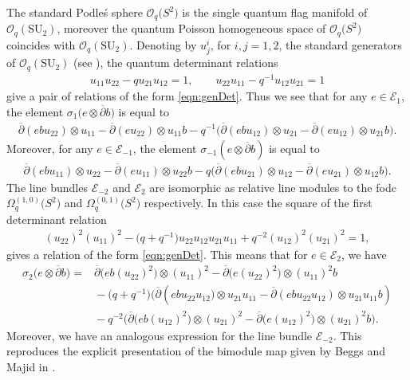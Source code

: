 \documentclass[10pt,a4paper]{amsart}
\numberwithin{equation}{section}
\newcommand\adel{\overline{\partial}}
\begin{document}
The standard Podle\'s sphere $\mathcal{O}_q\big(S^2\big)$ is the single quantum flag manifold of $\mathcal{O}_q(\mathrm{SU}_2)$, moreover the quantum Poisson homogeneous space of $\mathcal{O}_q\big(S^2\big)$ coincides with $\mathcal{O}_q(\mathrm{SU}_2)$. Denoting by $u^i_j$, for $i,j = 1,2$, the standard generators of $\mathcal{O}_q(\mathrm{SU}_2)$ (see \cite[Section~4.1]{KSLeabh}), the quantum determinant relations
\begin{gather*}
u_{11}u_{22} - qu_{21}u_{12} = 1, \qquad u_{22}u_{11} - q^{-1}u_{12}u_{21} = 1
\end{gather*}
give a pair of relations of the form \eqref{eqn:genDet}. Thus we see that for any $e \in \mathcal{E}_1$, the element $\sigma_1\big(e \otimes \adel b\big)$ is equal to
\begin{gather*}
\adel(ebu_{22}) \otimes u_{11}- \adel(eu_{22}) \otimes u_{11} b - q^{-1} \big(\adel(ebu_{12}) \otimes u_{21}-\adel(eu_{12}) \otimes u_{21}b\big).
\end{gather*}
Moreover, for any $e \in \mathcal{E}_{-1}$, the element $\sigma_{-1}(e \otimes \adel b)$ is equal to
\begin{gather*}
\adel(ebu_{11}) \otimes u_{22}-\adel(eu_{11}) \otimes u_{22}b - q\big( \adel(ebu_{21}) \otimes u_{12}- \adel(eu_{21}) \otimes u_{12}b\big).
\end{gather*}
The line bundles $\mathcal{E}_{-2}$ and $\mathcal{E}_{2}$ are isomorphic as relative line modules to the fodc $\Omega^{(1,0)}_q\big(S^2\big)$ and $\Omega^{(0,1)}_q\big(S^2\big)$ respectively. In this case the square of the first determinant relation
\begin{gather*}
(u_{22})^2(u_{11})^2-\big(q+q^{-1}\big)u_{22}u_{12}u_{21}u_{11}+q^{-2}(u_{12})^2(u_{21})^2=1,
\end{gather*}
gives a relation of the form \eqref{eqn:genDet}. This means that for $e \in \mathcal{E}_2$, we have
\begin{align*}
\sigma_2\big(e \otimes \adel b\big) ={} & \adel\big(eb(u_{22})^2\big) \otimes (u_{11})^2 -\adel\big(e(u_{22})^2\big) \otimes (u_{11})^2b
\\&{}- \big(q+q^{-1}\big)\big(\adel(ebu_{22}u_{12}\big) \otimes u_{21}u_{11} -\adel(ebu_{22}u_{12}) \otimes u_{21}u_{11}b)
\\&{} - q^{-2} \big(\adel\big(eb(u_{12})^2\big)\otimes (u_{21})^2-\adel\big(e(u_{12})^2\big) \otimes (u_{21})^2b\big).
\end{align*}
Moreover, we have an analogous expression for the line bundle $\mathcal{E}_{-2}$.
This reproduces the explicit presentation of the bimodule map given by Beggs and Majid in \cite[example 5.51]{BeggsMajid:Leabh}.
\end{document}
